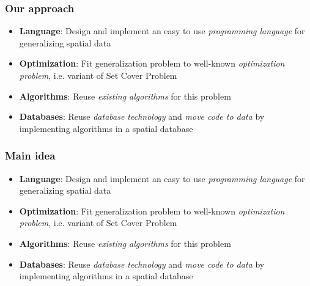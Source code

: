 \documentclass{beamer}
\begin{document}
\frame
{
  \frametitle{Our approach}
  \begin{itemize}
  \item \textbf{Language}: Design and implement an easy to use \emph{programming language} for generalizing spatial data 
  \item \textbf{Optimization}: Fit generalization problem to well-known \emph{optimization problem}, i.e. variant of Set Cover Problem~\cite{vazirani}
  \item \textbf{Algorithms}: Reuse \emph{existing algorithms} for this problem
  \item \textbf{Databases}: Reuse \emph{database technology} and \emph{move code to data} by implementing algorithms in a spatial database
  \end{itemize}
  \begin{center}
  \end{center}
}

\frame
{
  \frametitle{Main idea}
  \begin{itemize}
  \item \textbf{Language}: Design and implement an easy to use \emph{programming language} for generalizing spatial data 
  \item \textbf{Optimization}: Fit generalization problem to well-known \emph{optimization problem}, i.e. variant of Set Cover Problem~\cite{vazirani}
  \item \textbf{Algorithms}: Reuse \emph{existing algorithms} for this problem
  \item \textbf{Databases}: Reuse \emph{database technology} and \emph{move code to data} by implementing algorithms in a spatial database
  \end{itemize}
  \begin{center}
  \end{center}
}
\end{document}
